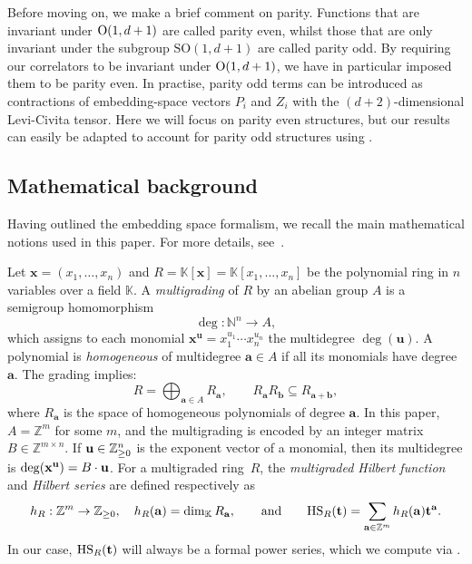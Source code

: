 \documentclass[12pt,a4paper]{extarticle}
\theoremstyle{definition}
\newcommand{\K}{\mathbb{K}}
\begin{document}
Before moving on, we make a brief comment on parity. Functions that are invariant under ${\rm O}(1,d+1)$ are called parity even, whilst those that are only invariant under the subgroup $\mathrm{SO}(1,d+1)$ are called parity odd. By requiring our correlators to be invariant under ${\rm O}(1,d+1)$, we have in particular imposed them to be parity even. In practise, parity odd terms can be introduced as contractions of embedding-space vectors $P_i$ and $Z_i$ with the $(d+2)$-dimensional Levi-Civita tensor. Here we will focus on parity even structures, but our results can easily be adapted to account for parity odd structures using \cite[Section 4.2.3]{CPPR}.

\subsection{Mathematical background}
Having outlined the embedding space formalism, we  recall the main
mathematical notions used in this paper. For more details, see~{\cite{cox1997ideals, michalekSturmfels2021, CCA, Shafarevich2}.}

\medskip

Let $\mathbf{x}=(x_1,\ldots,x_n)$ and
$R=\mathbb{K}[\mathbf{x}]=\mathbb{K}[x_1,\ldots,x_n]$ be the polynomial ring in $n$ variables over a field $\K$. A \emph{multigrading} of $R$
by an abelian group $A$ is a semigroup homomorphism
$$
    \deg:\mathbb{N}^n\to A,
$$
which assigns to each monomial
$\mathbf{x}^{\mathbf{u}}=x_1^{u_1}\cdots x_n^{u_n}$ the multidegree
$\deg(\mathbf{u})$.
A polynomial is \emph{homogeneous} of multidegree $\mathbf{a}\in A$ if all
its monomials have degree $\mathbf{a}$. The grading implies: 
\begin{equation}
    R=\bigoplus_{\mathbf{a}\in A} R_{\mathbf{a}},
    \qquad
    R_{\mathbf{a}}R_{\mathbf{b}}\subseteq R_{\mathbf{a}+\mathbf{b}},    
\end{equation}
where $R_{\mathbf{a}}$ is the space of homogeneous polynomials of
degree $\mathbf{a}$.
In this paper, $A=\mathbb{Z}^m$ for some $m$, and the multigrading is encoded by an integer matrix $B\in \mathbb Z^{m\times n}$. If ${\bf u}\in \mathbb Z_{\geq 0}^n$ is the exponent vector of a monomial, then its multidegree is
$
\deg({\bf x^u})=B \cdot {\bf u}
$.
For a multigraded ring~$R$, the \emph{multigraded Hilbert function}
and \emph{Hilbert series} are defined respectively as
\begin{equation}\label{eq: HS preliminaries}
 h_R:\mathbb{Z}^m\to\mathbb{Z}_{\geq 0},
    \quad
    h_R(\mathbf{a})  =\dim_{\mathbb{K}} R_{\mathbf{a}}, \qquad \text{and} \qquad 
 {\rm HS}_R(\mathbf{t})
     =
    \sum_{\mathbf{a}\in\mathbb{Z}^m}
    h_R(\mathbf{a})\mathbf{t}^{\mathbf{a}}.   
\end{equation}
In our case, $ {\rm HS}_R(\mathbf{t})$ will always be a formal power series, which we compute via
\cite[Lem.~8.16]{CCA}.
\end{document}

